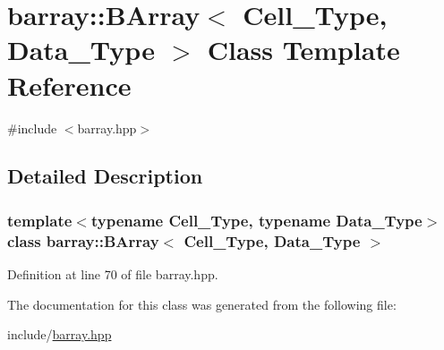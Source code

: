 \hypertarget{classbarray_1_1_b_array}{}\section{barray\+:\+:B\+Array$<$ Cell\+\_\+\+Type, Data\+\_\+\+Type $>$ Class Template Reference}
\label{classbarray_1_1_b_array}


{\ttfamily \#include $<$barray.\+hpp$>$}



\subsection{Detailed Description}
\subsubsection*{template$<$typename Cell\+\_\+\+Type, typename Data\+\_\+\+Type$>$\newline
class barray\+::\+B\+Array$<$ Cell\+\_\+\+Type, Data\+\_\+\+Type $>$}



Definition at line 70 of file barray.\+hpp.



The documentation for this class was generated from the following file\+:\begin{DoxyCompactItemize}
\item 
include/\hyperlink{barray_8hpp}{barray.\+hpp}\end{DoxyCompactItemize}
